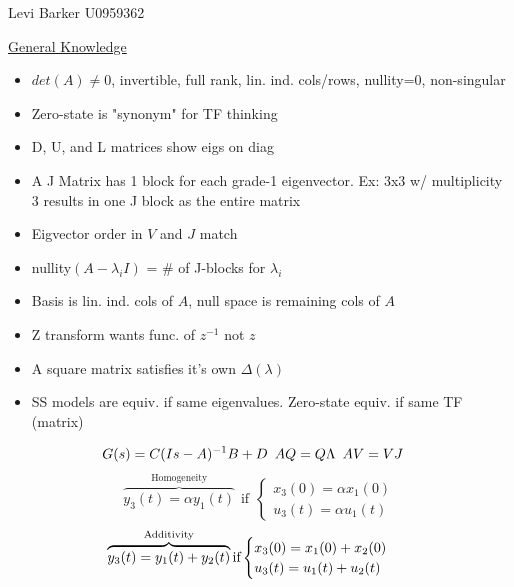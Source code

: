 \documentclass[twocolumn]{article}    %
\begin{document}
\pagestyle{empty}
\footnotesize                      %

\begin{center}
    Levi Barker \hspace{35pt} U0959362
\end{center}
\vspace{-10pt}
\underline{General Knowledge}
\begin{itemize}
    \item \(det(A)\neq0\), invertible, full rank, lin. ind. cols/rows, nullity=0, non-singular
    \item Zero-state is "synonym" for TF thinking
    \item D, U, and L matrices show eigs on diag 
    \item A J Matrix has 1 block for each grade-1 eigenvector. Ex: 3x3 w/ multiplicity 3 results in one J block as the entire matrix
    \item Eigvector order in \(V\) and \(J\) match 
    \item nullity\((A-\lambda_iI)\) = \# of J-blocks for \(\lambda_i\)
    \item Basis is lin. ind. cols of \(A\), null space is remaining cols of \(A\)
    \item Z transform wants func. of \(z^{-1}\) not \(z\) 
    \item A square matrix satisfies it's own \(\Delta(\lambda)\)
    \item SS models are equiv. if same eigenvalues. Zero-state equiv. if same TF (matrix)
\end{itemize}
\begin{equation*}
    \hspace{-10pt} G(s) = C(Is-A)^{-1}B+D \hspace{5pt} AQ = Q\Lambda \hspace{5pt} AV=VJ
\end{equation*}
\begin{equation*}
    \overbrace{y_3(t) = \alpha y_1(t)}^\text{Homogeneity} \hspace{5pt}\text{if} \hspace{5pt}
    \begin{cases}
        x_3(0) = \alpha x_1(0)\\
        u_3(t) = \alpha u_1(t)
    \end{cases}
\end{equation*}
\begin{equation*}
    \hspace{-7.5pt}
    \overbrace{y_3(t) = y_1(t) + y_2(t)}^\text{Additivity} \text{if}
    \begin{cases}
        x_3(0) = x_1(0) + x_2(0) \\
        u_3(t) = u_1(t) + u_2(t)
    \end{cases}
\end{equation*}
\end{document}
